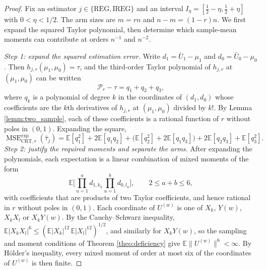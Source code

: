 \documentclass{article}
\newcommand{\EEE}{\mathbb{E}}
\newcommand{\htau}{\hat{\tau}}
\DeclareMathOperator{\MSE}{MSE}
\newcommand{\CRT}{\mathrm{CRT}}
\newcommand{\IREG}{\mathrm{IREG}}
\newcommand{\REG}{\mathrm{REG}}
\newcommand{\MSEexp}{\MSE^{\mathrm{exp}}}
\theoremstyle{plain}
\theoremstyle{definition}
\theoremstyle{remark}
\begin{document}
\begin{proof}
Fix an estimator $j\in\{\REG,\IREG\}$ and an interval
$I_\eta=[\frac12-\eta,\frac12+\eta]$ with $0<\eta<1/2$.
The arm sizes are $m=rn$ and $n-m=(1-r)n$. We first expand the
squared Taylor polynomial, then determine which sample-mean moments
can contribute at orders $n^{-1}$ and $n^{-2}$.

\emph{Step 1: expand the squared estimation error.}
Write $d_1=\bar U_1-\mu_1$ and $d_0=\bar U_0-\mu_0$. Then $h_{j,r}(\mu_1,\mu_0)=\tau$, and the third-order Taylor polynomial of $h_{j,r}$ at $(\mu_1,\mu_0)$ can be written
\[
\mathcal P_r-\tau=q_1+q_2+q_3,
\]
where $q_k$ is a polynomial of degree $k$ in the coordinates of $(d_1,d_0)$ whose coefficients are the $k$th derivatives of $h_{j,r}$ at $(\mu_1,\mu_0)$ divided by $k!$. By Lemma \ref{lemm:two_sample}, each of these coefficients is a rational function of $r$ without poles in $(0,1)$. Expanding the square,
\[
\MSEexp_{\CRT,r}(\htau_j)
=\EEE[q_1^2]+2\EEE[q_1q_2]+\big(\EEE[q_2^2]+2\EEE[q_1q_3]\big)+2\EEE[q_2q_3]+\EEE[q_3^2].
\]
\emph{Step 2: justify the required moments and separate the arms.}
After expanding the polynomials, each expectation is a linear
combination of mixed moments of the form
\begin{equation}
\label{eq:mixed_moment}
\EEE\Big[\prod_{u=1}^{a}d_{1,k_u}\prod_{u=1}^{b}d_{0,l_u}\Big],\qquad 2\le a+b\le 6,
\end{equation}
with coefficients that are products of two Taylor coefficients, and hence rational in $r$ without poles in $(0,1)$. Each coordinate of $U^{(w)}$ is one of $X_k$, $Y(w)$, $X_kX_l$ or $X_kY(w)$. By the Cauchy--Schwarz inequality, $\EEE|X_kX_l|^6\le(\EEE|X_k|^{12}\,\EEE|X_l|^{12})^{1/2}$, and similarly for $X_kY(w)$, so the sampling and moment conditions of Theorem \ref{theo:deficiency} give $\EEE\|U^{(w)}\|^6<\infty$. By H\"older's inequality, every mixed moment of order at most six of the coordinates of $U^{(w)}$ is then finite.


\end{proof}
\end{document}
